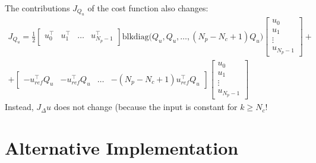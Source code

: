 \documentclass[a4paper,12pt,fleqn]{book}
\newcommand{\Np}{{N_p}}
\newcommand{\Nc}{{N_c}}
\newcommand{\blkdiag}{\text{blkdiag}}
\begin{document}
The contributions $J_{Q_u}$ of the cost function also changes:
\begin{multline}
\label{eq:J_Qu_Nc}
 J_{Q_u} = \frac{1}{2}
 \begin{bmatrix}
  u_0^\top & u_1^\top &\dots & u_{\Np-1}^\top
 \end{bmatrix}
 \blkdiag\bigg(Q_u, Q_u, \dots, (\Np - \Nc + 1)Q_u\bigg)
 \begin{bmatrix}
  u_0 \\  u_1\\ \vdots\\  u_{\Np-1}
 \end{bmatrix}
  + \\
 +
  \begin{bmatrix}
  -u_{ref}^\top Q_u & -u_{ref}^\top Q_u &\dots & -(\Np - \Nc + 1)u_{ref}^\top Q_u
 \end{bmatrix}
 \begin{bmatrix}
  u_0 \\ u_1 \\ \vdots \\ u_{\Np-1}
 \end{bmatrix}
 \end{multline}
Instead, $J_\Delta u$ does not change (because the input is constant for $k \geq N_c$!


\chapter{Alternative Implementation}
\end{document}
